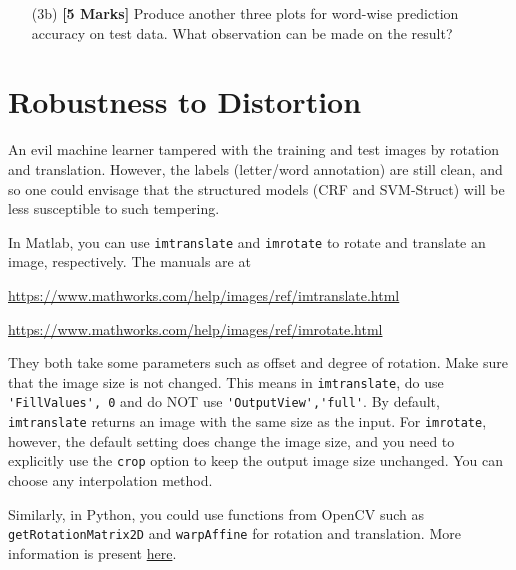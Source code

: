 \documentclass[11pt]{report}
\begin{document}
\begin{itemize}
	\item[(3b)] {\bf [5 Marks]} Produce another three plots for word-wise prediction accuracy on test data.  What observation can be made on the result?
\end{itemize}


\section{Robustness to Distortion}

An evil machine learner tampered with the training and test images by rotation and translation.
However, the labels (letter/word annotation) are still clean, and so
one could envisage that the structured models (CRF and SVM-Struct) will be less susceptible to such tempering.

In Matlab, you can use \verb#imtranslate# and \verb#imrotate# to rotate and translate an image, respectively.
The manuals are at

\href{https://www.mathworks.com/help/images/ref/imtranslate.html}{https://www.mathworks.com/help/images/ref/imtranslate.html}

\href{https://www.mathworks.com/help/images/ref/imrotate.html}{https://www.mathworks.com/help/images/ref/imrotate.html}

They both take some parameters such as offset and degree of rotation.
Make sure that the image size is not changed. 
This means in \verb#imtranslate#, 
do use \verb#'FillValues', 0# and do NOT use \verb#'OutputView','full'#.
By default, \verb#imtranslate# returns an image with the same size as the input.
For \verb#imrotate#, however, the default setting does change the image size, and you need to explicitly use the \verb#crop# option to keep the output image size unchanged.
You can choose any interpolation method.

Similarly, in Python, you could use functions from OpenCV such as
\texttt{getRotationMatrix2D} and \texttt{warpAffine} for rotation and
translation. More information is present \href{https://opencv-python-tutroals.readthedocs.io/en/latest/py\_tutorials/py\_imgproc/py\_geometric\_transformations/py\_geometric\_transformations.html}{here}.
\end{document}
